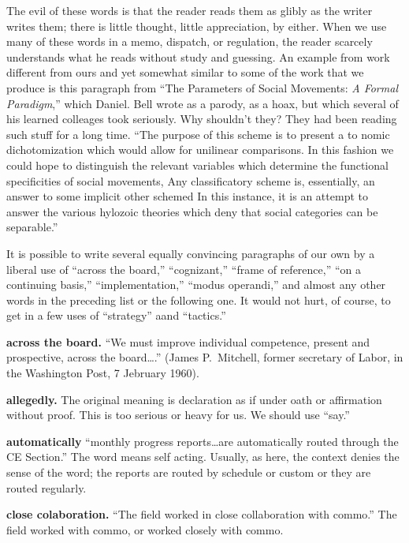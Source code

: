 \documentclass[
    oneside,
    11pt,
    draft
]{memoir}
\begin{document}
The evil of these words is that the reader reads them as glibly as the writer writes them; there is little thought, little appreciation, by either. When we use many of these words in a memo, dispatch, or regulation, the reader scarcely understands what he reads without study and guessing. An example from work different from ours and yet somewhat similar to some of the work that we produce is this paragraph from \enquote{The Parameters of Social Movements: \emph{A Formal Paradigm},} which Daniel. Bell wrote as a parody, as a hoax, but which several of his learned colleages took seriously. Why shouldn't they? They had been reading such stuff for a long time. \enquote{The purpose of this scheme is to present a to nomic dichotomization which would allow for unilinear comparisons. In this fashion we could hope to distinguish the relevant variables which determine the functional specificities of social movements, Any classificatory scheme is, essentially, an answer to some implicit other schemed In this instance, it is an attempt to answer the various hylozoic theories which deny that social categories can be separable.} 

It is possible to write several equally convincing paragraphs of our own by a liberal use of \enquote{across the board,} \enquote{cognizant,} \enquote{frame of reference,} \enquote{on a continuing basis,} \enquote{implementation,} \enquote{modus operandi,} and almost any other words in the preceding list or the following one. It would not hurt, of course, to get in a few uses of \enquote{strategy} aand \enquote{tactics.}

\textbf{across the board.} \enquote{We must improve individual competence, present and prospective, across the board\dots.} (James P.\ Mitchell, former secretary of Labor, in the Washington Post, 7 Jebruary 1960).

\textbf{allegedly.} The original meaning is declaration as if under oath or affirmation without proof. This is too serious or heavy for us. We should use \enquote{say.}

\textbf{automatically} \enquote{monthly progress reports\dots are automatically routed through the CE Section.} The word means self acting. Usually, as here, the context denies the sense of the word; the reports are routed by schedule or custom or they are routed regularly.

\textbf{close colaboration.} \enquote{The field worked in close collaboration with commo.} The field worked with commo, or worked closely with commo. 
\end{document}
